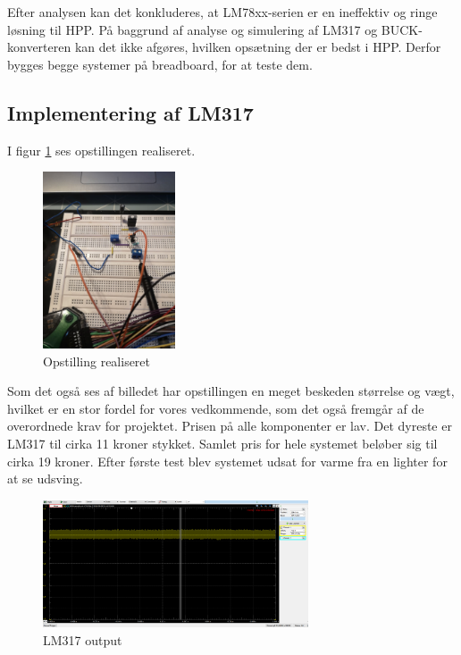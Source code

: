 Efter analysen kan det konkluderes, at LM78xx-serien er en ineffektiv og ringe løsning til HPP. På baggrund af analyse og simulering af LM317 og BUCK-konverteren kan det ikke afgøres, hvilken opsætning der er bedst i HPP. Derfor bygges begge systemer på breadboard, for at teste dem.

\subsection{Implementering af LM317}
\label{sec:impl-af-lm317}

I figur \ref{fig:j6} ses opstillingen realiseret. 

\begin{figure}[h]
  \centering
  \includegraphics[width=0.35\textwidth]{./figurer/j6.png}
  \caption{Opstilling realiseret}
  \label{fig:j6}
\end{figure}


Som det også ses af billedet har opstillingen en meget beskeden størrelse og vægt, hvilket er en stor fordel for vores vedkommende, som det også fremgår af de overordnede krav for projektet. Prisen på alle komponenter er lav. Det dyreste er LM317 til cirka 11 kroner stykket. Samlet pris for hele systemet beløber sig til cirka 19 kroner. Efter første test blev systemet udsat for varme fra en lighter for at se udsving.
\begin{figure}[h]
  \centering
  \includegraphics[width=0.7\textwidth]{./figurer/j7.png}
  \caption{LM317 output}
  \label{fig:j7}
\end{figure}

